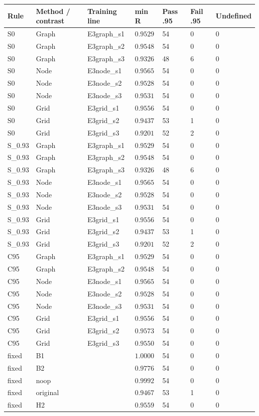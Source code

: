 \begin{tabular}{lllllll}
\hline
Rule & Method / contrast & Training line & min R & Pass .95 & Fail .95 & Undefined \\
\hline
S0 & Graph & E3graph\_s1 & $0.9529$ & 54 & 0 & 0 \\
S0 & Graph & E3graph\_s2 & $0.9548$ & 54 & 0 & 0 \\
S0 & Graph & E3graph\_s3 & $0.9326$ & 48 & 6 & 0 \\
S0 & Node & E3node\_s1 & $0.9565$ & 54 & 0 & 0 \\
S0 & Node & E3node\_s2 & $0.9528$ & 54 & 0 & 0 \\
S0 & Node & E3node\_s3 & $0.9531$ & 54 & 0 & 0 \\
S0 & Grid & E3grid\_s1 & $0.9556$ & 54 & 0 & 0 \\
S0 & Grid & E3grid\_s2 & $0.9437$ & 53 & 1 & 0 \\
S0 & Grid & E3grid\_s3 & $0.9201$ & 52 & 2 & 0 \\
S\_0.93 & Graph & E3graph\_s1 & $0.9529$ & 54 & 0 & 0 \\
S\_0.93 & Graph & E3graph\_s2 & $0.9548$ & 54 & 0 & 0 \\
S\_0.93 & Graph & E3graph\_s3 & $0.9326$ & 48 & 6 & 0 \\
S\_0.93 & Node & E3node\_s1 & $0.9565$ & 54 & 0 & 0 \\
S\_0.93 & Node & E3node\_s2 & $0.9528$ & 54 & 0 & 0 \\
S\_0.93 & Node & E3node\_s3 & $0.9531$ & 54 & 0 & 0 \\
S\_0.93 & Grid & E3grid\_s1 & $0.9556$ & 54 & 0 & 0 \\
S\_0.93 & Grid & E3grid\_s2 & $0.9437$ & 53 & 1 & 0 \\
S\_0.93 & Grid & E3grid\_s3 & $0.9201$ & 52 & 2 & 0 \\
C95 & Graph & E3graph\_s1 & $0.9529$ & 54 & 0 & 0 \\
C95 & Graph & E3graph\_s2 & $0.9548$ & 54 & 0 & 0 \\
C95 & Node & E3node\_s1 & $0.9565$ & 54 & 0 & 0 \\
C95 & Node & E3node\_s2 & $0.9528$ & 54 & 0 & 0 \\
C95 & Node & E3node\_s3 & $0.9531$ & 54 & 0 & 0 \\
C95 & Grid & E3grid\_s1 & $0.9556$ & 54 & 0 & 0 \\
C95 & Grid & E3grid\_s2 & $0.9573$ & 54 & 0 & 0 \\
C95 & Grid & E3grid\_s3 & $0.9550$ & 54 & 0 & 0 \\
fixed & B1 &  & $1.0000$ & 54 & 0 & 0 \\
fixed & B2 &  & $0.9776$ & 54 & 0 & 0 \\
fixed & noop &  & $0.9992$ & 54 & 0 & 0 \\
fixed & original &  & $0.9467$ & 53 & 1 & 0 \\
fixed & H2 &  & $0.9559$ & 54 & 0 & 0 \\
\hline
\end{tabular}
